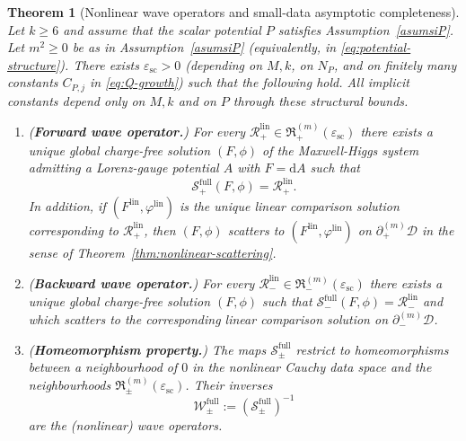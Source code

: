 \documentclass[11pt]{article}
\numberwithin{equation}{section}
\theoremstyle{plain}
\newtheorem{theorem}{Theorem}[section]
\theoremstyle{definition}
\theoremstyle{remark}
\newcommand{\D}{\mathcal{D}}
\newcommand{\dd}{\mathrm{d}}
\begin{document}
\begin{theorem}[Nonlinear wave operators and small-data asymptotic completeness]\label{thm:nonlinear-wave-operators}
Let $k\ge 6$ and assume that the scalar potential $P$ satisfies Assumption~\ref{asumsiP}.
Let $m^{2}\ge 0$ be as in Assumption~\ref{asumsiP} (equivalently, in \eqref{eq:potential-structure}).
There exists $\varepsilon_{\mathrm{sc}}>0$ (depending on $M,k$, on $N_{P}$, and on finitely many constants $C_{P,j}$ in \eqref{eq:Q-growth}) such that the following hold.
All implicit constants depend only on $M,k$ and on $P$ through these structural bounds.
\begin{enumerate}
\item[(i)] (\textbf{Forward wave operator.})
For every $\mathcal R_{+}^{\mathrm{lin}}\in \mathfrak R_{+}^{(m)}(\varepsilon_{\mathrm{sc}})$ there exists a unique global charge-free solution $(F,\phi)$ of the Maxwell-Higgs system admitting a Lorenz-gauge potential $A$ with $F=\dd A$ such that
\begin{equation}
\mathscr S_{+}^{\mathrm{full}}(F,\phi)=\mathcal R_{+}^{\mathrm{lin}}.
\end{equation}
In addition, if $(F^{\mathrm{lin}},\varphi^{\mathrm{lin}})$ is the unique linear comparison solution corresponding to $\mathcal R_{+}^{\mathrm{lin}}$, then $(F,\phi)$ scatters to $(F^{\mathrm{lin}},\varphi^{\mathrm{lin}})$ on $\partial_{+}^{(m)}\D$ in the sense of Theorem~\ref{thm:nonlinear-scattering}.

\item[(ii)] (\textbf{Backward wave operator.})
For every $\mathcal R_{-}^{\mathrm{lin}}\in \mathfrak R_{-}^{(m)}(\varepsilon_{\mathrm{sc}})$ there exists a unique global charge-free solution $(F,\phi)$ such that $\mathscr S_{-}^{\mathrm{full}}(F,\phi)=\mathcal R_{-}^{\mathrm{lin}}$ and which scatters to the corresponding linear comparison solution on $\partial_{-}^{(m)}\D$.

\item[(iii)] (\textbf{Homeomorphism property.})
The maps $\mathscr S_{\pm}^{\mathrm{full}}$ restrict to homeomorphisms between a neighbourhood of $0$ in the nonlinear Cauchy data space and the neighbourhoods $\mathfrak R_{\pm}^{(m)}(\varepsilon_{\mathrm{sc}})$.
Their inverses
\begin{equation}
\mathscr W_{\pm}^{\mathrm{full}}:=(\mathscr S_{\pm}^{\mathrm{full}})^{-1}
\end{equation}
are the (nonlinear) wave operators.
\end{enumerate}
\end{theorem}
\end{document}
